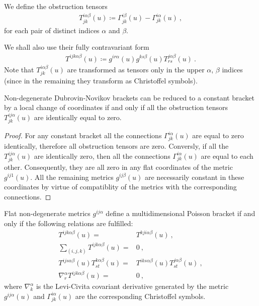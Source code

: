 \begin{definition}
    We define the obstruction tensors
    \begin{align}
        T^{i \alpha \beta}_{jk} (u) \coloneqq \Gamma^{i \beta}_{jk}(u) - \Gamma^{i \alpha}_{jk}(u) \:,
    \end{align}
    for each pair of distinct indices $\alpha$ and $\beta$.
\end{definition}
We shall also use their fully contravariant form
\begin{align}
    T^{ijk \alpha \beta}(u) \coloneqq g^{i r \alpha}(u) g^{ks \beta}(u) T^{j \alpha \beta}_{rs} (u) \:.
\end{align}
Note that $T^{i \alpha \beta}_{jk} (u)$ are transformed as tensors only in the upper $\alpha$, $\beta$ indices (since in the remaining they transform as Christoffel symbols).

\begin{lemma} \label{lemma:T=0}
    Non-degenerate Dubrovin-Novikov brackets can be reduced to a constant bracket by a local change of coordinates if and only if all the obstruction tensors $T^{ij \alpha}_{jk}(u)$ are identically equal to zero.
\end{lemma}
\begin{proof}
    For any constant bracket all the connections $\Gamma^{i\alpha}_{jk}(u)$ are equal to zero identically, therefore all obstruction tensors are zero. Conversly, if all the $T^{ij \alpha}_{jk}(u)$ are identically zero, then all the connections $\Gamma^{i\alpha}_{jk}(u)$ are equal to each other. Consequently, they are all zero in any flat coordinates of the metric $g^{ij 1}(u)$. All the remaining metrics $g^{ij \beta}(u)$ are necessarily constant in these coordinates by virtue of compatiblity of the metrics with the corresponding connections.
\end{proof}


\begin{theorem}[Mokhov]
    Flat non-degenerate metrics $g^{ij \alpha}$ define a multidimensional Poisson bracket if and only if the following relations are fulfilled:
    \begin{align}
        T^{ijk \alpha \beta}(u) =& T^{kji \alpha \beta}(u) \:, \label{eq:Mochov-1}\\
        \sum_{(i,j,k)} T^{ijk \alpha \beta}(u) =& 0 \:, \label{eq:Mochov-2}\\
        T^{ij s \alpha \beta}(u) T^{k \alpha \beta}_{st}(u) =& T^{i k s \alpha \beta}(u) T^{j \alpha \beta}_{st} (u) \:, \label{eq:Mochov-3}\\
        \nabla^\alpha_r T^{ijk \alpha \beta}(u) =& 0 \:, \label{eq:Mochov-4}
    \end{align}
    where $\nabla^\alpha_k$ is the Levi-Civita covariant derivative generated by the metric $g^{ij \alpha}(u)$ and $\Gamma^{i \alpha}_{jk}(u)$ are the corresponding Christoffel symbols. 
\end{theorem}

